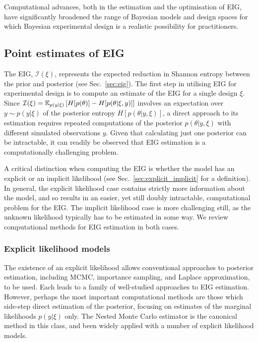 \documentclass[a4paper, 10pt]{report}
\theoremstyle{plain}
\begin{document}
	Computational advances, both in the estimation and the optimisation of EIG, have significantly broadened the range of Bayesian models and design spaces for which Bayesian experimental design is a realistic possibility for practitioners. 
	
	
	
	\subsection{Point estimates of EIG}
	\label{sec:point_eig}
	The EIG, $\mathcal{I}(\xi)$, represents the expected reduction in Shannon entropy between the prior and posterior (see Sec.~\ref{sec:eig}).
	The first step in utilising EIG for experimental design is to compute an estimate of the EIG for a single design $\xi$.
	Since $\mathcal{I}(\xi) = \mathbb{E}_{p(y|\xi)}\left[ H[p(\theta)] - H[p(\theta|\xi,y)] \right]$ involves an expectation over $y \sim p(y|\xi)$ of the posterior entropy $H[p(\theta|y,\xi)]$, a direct approach to its estimation requires repeated computations of the posterior $p(\theta|y,\xi)$ with different simulated observations $y$. 
	Given that calculating just one posterior can be intractable, it can readily be observed that EIG estimation is a computationally challenging problem.
	
	A critical distinction when computing the EIG is whether the model has an explicit or an implicit likelihood (see Sec.~\ref{sec:explicit_implicit} for a definition).
	In general, the explicit likelihood case contains strictly more information about the model, and so results in an easier, yet still doubly intractable, computational problem for the EIG.
	The implicit likelihood case is more challenging still, as the unknown likelihood typically has to be estimated in some way.
	We review computational methods for EIG estimation in both cases.
	
	\subsubsection{Explicit likelihood models}
	The existence of an explicit likelihood allows conventional approaches to posterior estimation, including MCMC, importance sampling, and Laplace approximation, to be used. Each leads to a family of well-studied approaches to EIG estimation.
	However, perhaps the most important computational methods are those which side-step direct estimation of the posterior, focusing on estimates of the marginal likelihoods $p(y|\xi)$ only.
	The Nested Monte Carlo estimator \citep{ryan2003estimating} is the canonical method in this class, and been widely applied with a number of explicit likelihood models.
	
\end{document}
